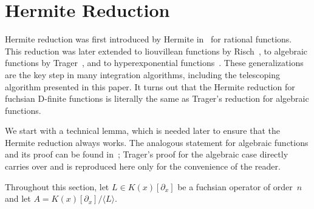 \documentclass{sig-alternate}
\def\<#1>{\langle#1\rangle}
\begin{document}
\section{Hermite Reduction}\label{sec:hermite}

Hermite reduction was first introduced by Hermite in~\cite{Hermite1872} for
rational functions.  This reduction was later extended to liouvillean
functions by Risch~\cite{Risch1969,Risch1970,ACA1992,bronstein98,BronsteinBook}, to algebraic functions by
Trager~\cite{trager84,ACA1992,bronstein98}, and to hyperexponential
functions~\cite{bostan13a}.  These generalizations are the key step in many
integration algorithms, including the telescoping algorithm presented in this
paper. It turns out that the Hermite reduction for fuchsian D-finite functions
is literally the same as Trager's reduction for algebraic functions.

We start with a technical lemma, which is needed later to ensure that the
Hermite reduction always works. The analogous statement for algebraic
functions and its proof can be found in~\cite[pp. 46--47]{trager84}; Trager's
proof for the algebraic case directly carries over and is reproduced here
only for the convenience of the reader.

Throughout this section, let $L\in K(x)[\partial_x]$ be a fuchsian operator
of order~$n$ and let $A=K(x)[\partial_x]/\<L>$.
\end{document}
